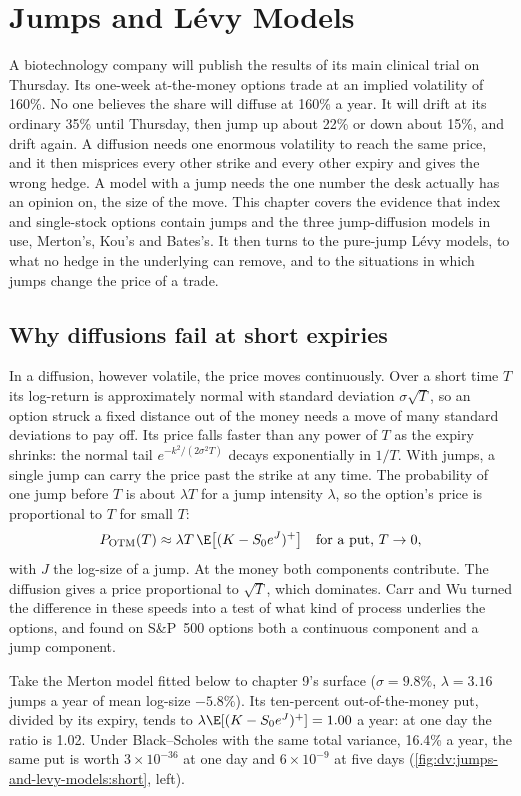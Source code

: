 \chapter{Jumps and Lévy Models}\label{ch:dv:jumps-and-levy-models}

A biotechnology company will publish the results of its main clinical trial on Thursday. Its one-week
at-the-money options trade at an implied volatility of 160\%. No one believes the share will diffuse at
160\% a year. It will drift at its ordinary 35\% until Thursday, then jump up about 22\% or down about 15\%,
and drift again. A diffusion needs one enormous volatility to reach the same price, and it then misprices
every other strike and every other expiry and gives the wrong hedge. A model with a jump needs the one
number the desk actually has an opinion on, the size of the move. This chapter covers the evidence that
index and single-stock options contain jumps and the three jump-diffusion models in use, Merton's, Kou's and
Bates's. It then turns to the pure-jump Lévy models, to what no hedge in the underlying can remove, and to the
situations in which jumps change the price of a trade.

\section{Why diffusions fail at short expiries}

In a diffusion, however volatile, the price moves continuously. Over a short time $T$ its log-return is
approximately normal with standard deviation $\sigma\sqrt T$, so an option struck a fixed distance out of the
money needs a move of many standard deviations to pay off. Its price falls faster than any power of $T$ as
the expiry shrinks: the normal tail $e^{-k^2/(2\sigma^2T)}$ decays exponentially in $1/T$. With jumps, a single
jump can carry the price past the strike at any time. The probability of one jump before $T$ is about
$\lambda T$ for a jump intensity $\lambda$, so the option's price is proportional to $T$ for small $T$:
\[
P_{\mathrm{OTM}}(T)\approx\lambda T\,\E\bigl[(K-S_0e^{J})^+\bigr]\quad\text{for a put, }T\to0,
\]
with $J$ the log-size of a jump. At the money both components contribute. The diffusion gives a price
proportional to $\sqrt T$, which dominates. Carr and Wu turned the difference in these speeds into a test of
what kind of process underlies the options, and found on S\&P~500 options both a continuous component and a
jump component.

\begin{example}\label{ex:dv:jumps-and-levy-models:carrwu}
Take the Merton model fitted below to chapter 9's surface ($\sigma=9.8\%$, $\lambda=3.16$ jumps a year of mean
log-size $-5.8\%$). Its ten-percent out-of-the-money put, divided by its expiry, tends to
$\lambda\E[(K-S_0e^J)^+]=1.00$ a year: at one day the ratio is 1.02. Under Black--Scholes with the same total
variance, 16.4\% a year, the same put is worth $3\times10^{-36}$ at one day and $6\times10^{-9}$ at five days
(\cref{fig:dv:jumps-and-levy-models:short}, left).
\end{example}

